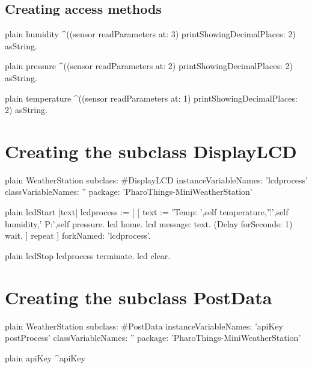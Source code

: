 \documentclass[10pt,twoside,english]{_support/latex/sbabook/sbabook}
\begin{document}
\subsection{Creating access methods}
\begin{displaycode}{plain}
humidity
    ^((sensor readParameters at: 3) printShowingDecimalPlaces: 2) asString. 
\end{displaycode}

\begin{displaycode}{plain}
pressure
    ^((sensor readParameters at: 2) printShowingDecimalPlaces: 2) asString. 
\end{displaycode}

\begin{displaycode}{plain}
temperature 
    ^((sensor readParameters at: 1) printShowingDecimalPlaces: 2) asString.
\end{displaycode}
\section{Creating the subclass DisplayLCD}
\begin{displaycode}{plain}
WeatherStation subclass: #DisplayLCD
    instanceVariableNames: 'lcdprocess'
    classVariableNames: ''
    package: 'PharoThings-MiniWeatherStation'
\end{displaycode}

\begin{displaycode}{plain}
lcdStart
    |text|
    lcdprocess :=  [ [        
    text := 'Temp: ',self temperature,'\H:',self humidity,' P:',self pressure. 
    lcd home. 
    lcd message: text. 
    (Delay forSeconds: 1) wait. 
    ] repeat ] forkNamed: 'lcdprocess'. 
\end{displaycode}

\begin{displaycode}{plain}
lcdStop
    lcdprocess terminate. 
    lcd clear.
\end{displaycode}
\section{Creating the subclass PostData}
\begin{displaycode}{plain}
WeatherStation subclass: #PostData
	instanceVariableNames: 'apiKey postProcess'
	classVariableNames: ''
	package: 'PharoThings-MiniWeatherStation'
\end{displaycode}

\begin{displaycode}{plain}
apiKey
    ^apiKey
\end{displaycode}
\end{document}
